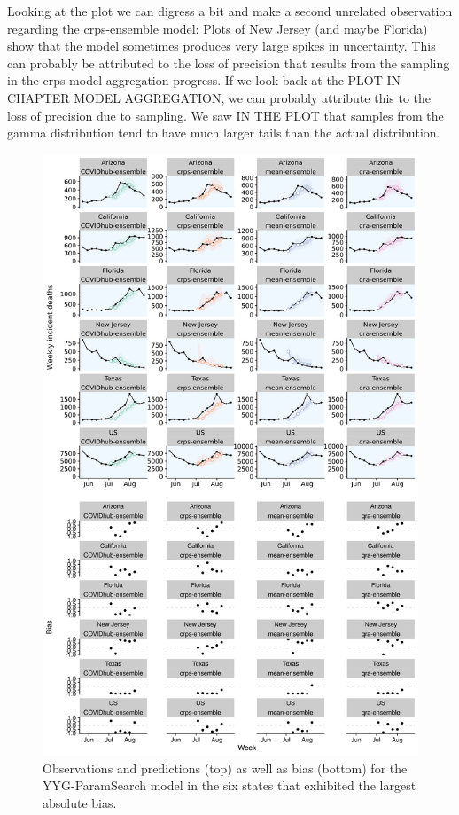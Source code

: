 \documentclass[
]{book}
\begin{document}
Looking at the plot we can digress a bit and make a second unrelated observation regarding the crps-ensemble model: Plots of New Jersey (and maybe Florida) show that the model sometimes produces very large spikes in uncertainty. This can probably be attributed to the loss of precision that results from the sampling in the crps model aggregation progress. If we look back at the PLOT IN CHAPTER MODEL AGGREGATION, we can probably attribute this to the loss of precision due to sampling. We saw IN THE PLOT that samples from the gamma distribution tend to have much larger tails than the actual distribution.

\begin{figure}
\includegraphics[width=1\linewidth]{../visualisation/chapter-5-results/bias_ensemble} \caption{Observations and predictions (top) as well as bias (bottom) for the YYG-ParamSearch model in the six states that exhibited the largest absolute bias.}\label{fig:bias-ensemble}
\end{figure}
\end{document}
